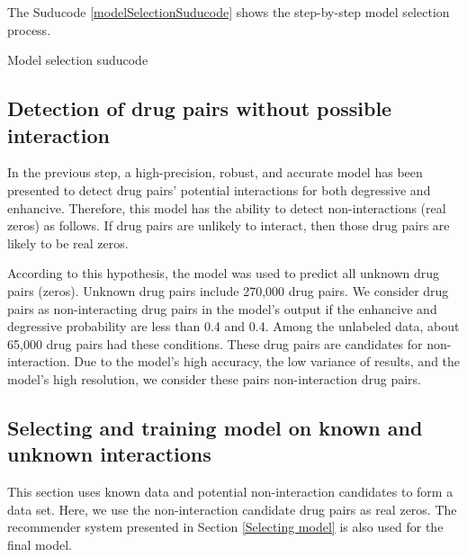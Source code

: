 \documentclass{bmcart}
\begin{document}
The Suducode \ref{modelSelectionSuducode} shows the step-by-step model selection process.

\renewcommand{\algorithmicrequire}{\textbf{Input:}}
\renewcommand{\algorithmicensure}{\textbf{Output:}}
\begin{algorithm}[!h]
\caption{Model selection suducode}
\label{modelSelectionSuducode}
\end{algorithm}


\subsection*{Detection of drug pairs without possible interaction}
In the previous step, a high-precision, robust, and accurate model has been presented to detect drug pairs' potential interactions for both degressive and enhancive. Therefore, this model has the ability to detect non-interactions (real zeros) as follows. If drug pairs are unlikely to interact, then those drug pairs are likely to be real zeros.

According to this hypothesis, the model was used to predict all unknown drug pairs (zeros). Unknown drug pairs include 270,000 drug pairs. We consider drug pairs as non-interacting drug pairs in the model's output if the enhancive and degressive probability are less than 0.4 and 0.4. Among the unlabeled data, about 65,000 drug pairs had these conditions. These drug pairs are candidates for non-interaction. Due to the model's high accuracy, the low variance of results, and the model's high resolution, we consider these pairs non-interaction drug pairs.

\subsection*{Selecting and training model on known and unknown interactions}
This section uses known data and potential non-interaction candidates to form a data set. Here, we use the non-interaction candidate drug pairs as real zeros. The recommender system presented in Section \ref{Selecting model} is also used for the final model.
\end{document}
